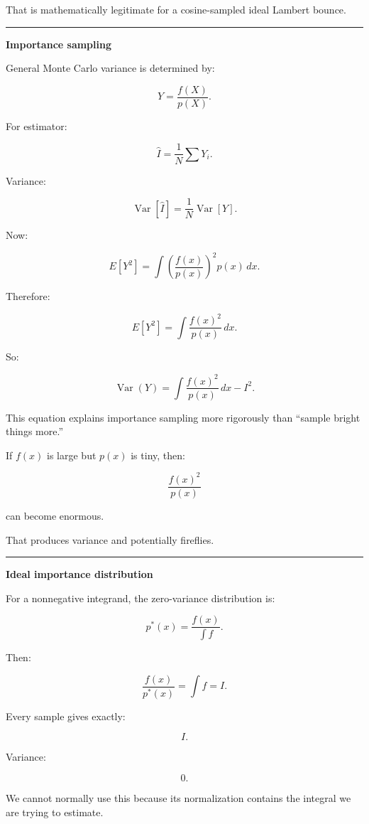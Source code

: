That is mathematically legitimate for a cosine-sampled ideal Lambert bounce.

\begin{center}\rule{0.5\linewidth}{0.5pt}\end{center}

\textbf{Importance sampling}

General Monte Carlo variance is determined by:

\[
Y=
\frac{f(X)}{p(X)}.
\]

For estimator:

\[
\hat I=\frac1N\sum Y_i.
\]

Variance:

\[
\operatorname{Var}[\hat I]
=
\frac{1}{N}
\operatorname{Var}[Y].
\]

Now:

\[
E[Y^2]
=
\int
\left(
\frac{f(x)}{p(x)}
\right)^2
p(x)\,dx.
\]

Therefore:

\[
E[Y^2]
=
\boxed{
\int
\frac{f(x)^2}{p(x)}
\,dx.
}
\]

So:

\[
\boxed{
\operatorname{Var}(Y)
=
\int
\frac{f(x)^2}{p(x)}
\,dx
-
I^2.
}
\]

This equation explains importance sampling more rigorously than ``sample bright things more.''

If \(f(x)\) is large but \(p(x)\) is tiny, then:

\[
\frac{f(x)^2}{p(x)}
\]

can become enormous.

That produces variance and potentially fireflies.

\begin{center}\rule{0.5\linewidth}{0.5pt}\end{center}

\textbf{Ideal importance distribution}

For a nonnegative integrand, the zero-variance distribution is:

\[
\boxed{
p^*(x)
=
\frac{
f(x)
}{
\int f
}.
}
\]

Then:

\[
\frac{f(x)}{p^*(x)}
=
\int f
=
I.
\]

Every sample gives exactly:

\[
I.
\]

Variance:

\[
0.
\]

We cannot normally use this because its normalization contains the integral we are trying to estimate.

